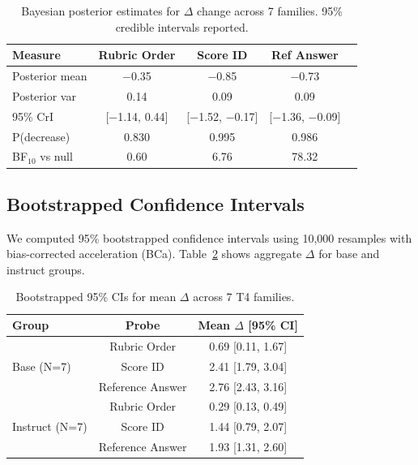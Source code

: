 \begin{table}[h]
\centering\small
\caption{Bayesian posterior estimates for $\Delta$ change across 7 families. 95\% credible intervals reported.}
\label{tab:bayesian}
\begin{tabular}{lcccc}
\toprule
\textbf{Measure} & \textbf{Rubric Order} & \textbf{Score ID} & \textbf{Ref Answer} \\
\midrule
Posterior mean & $-$0.35 & $-$0.85 & $-$0.73 \\
Posterior var & 0.14 & 0.09 & 0.09 \\
95\% CrI & [$-$1.14, 0.44] & [$-$1.52, $-$0.17] & [$-$1.36, $-$0.09] \\
P(decrease) & 0.830 & 0.995 & 0.986 \\
BF$_{10}$ vs null & 0.60 & 6.76 & 78.32 \\
\bottomrule
\end{tabular}
\par\vspace{2mm}
\end{table}

\subsection{Bootstrapped Confidence Intervals}

We computed 95\% bootstrapped confidence intervals using 10,000 resamples with bias-corrected acceleration (BCa). Table~\ref{tab:bootstrap} shows aggregate $\Delta$ for base and instruct groups.

\begin{table}[h]
\centering\small
\caption{Bootstrapped 95\% CIs for mean $\Delta$ across 7 T4 families.}
\label{tab:bootstrap}
\begin{tabular}{lcc}
\toprule
\textbf{Group} & \textbf{Probe} & \textbf{Mean $\Delta$ [95\% CI]} \\
\midrule
\multirow{3}{*}{Base (N=7)} & Rubric Order & 0.69 [0.11, 1.67] \\
& Score ID & 2.41 [1.79, 3.04] \\
& Reference Answer & 2.76 [2.43, 3.16] \\
\midrule
\multirow{3}{*}{Instruct (N=7)} & Rubric Order & 0.29 [0.13, 0.49] \\
& Score ID & 1.44 [0.79, 2.07] \\
& Reference Answer & 1.93 [1.31, 2.60] \\
\bottomrule
\end{tabular}
\end{table}

